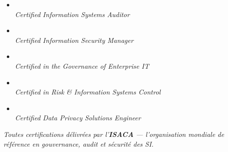 \begin{minipage}[t]{0.44\textwidth}
\begin{tcolorbox}[
    enhanced,
    colback=CouleurLizbiz,
    colframe=CouleurBordLizbiz,
    fonttitle=\bfseries\color{white},
    title={\ding{166}\quad Certifications Professionnelles},
    attach boxed title to top left={yshift=-2mm, xshift=4mm},
    boxed title style={colback=CouleurBordLizbiz, rounded corners},
    arc=3pt, boxrule=0.8pt,
    left=6pt, right=6pt, top=8pt, bottom=6pt
]
\begin{itemize}
    \item \textbf{}\\
          {\footnotesize \textit{Certified Information Systems Auditor}}
    \item \textbf{}\\
          {\footnotesize \textit{Certified Information Security Manager}}
    \item \textbf{}\\
          {\footnotesize \textit{Certified in the Governance of Enterprise IT}}
    \item \textbf{}\\
          {\footnotesize \textit{Certified in Risk \& Information Systems Control}}
    \item \textbf{}\\
          {\footnotesize \textit{Certified Data Privacy Solutions Engineer}}
\end{itemize}
{\footnotesize\color{CouleurBordInfo}\itshape
Toutes certifications délivrées par l'\textbf{ISACA} — l'organisation mondiale de référence en gouvernance, audit et sécurité des SI.}
\end{tcolorbox}
\end{minipage}

\vspace{1.5ex}


